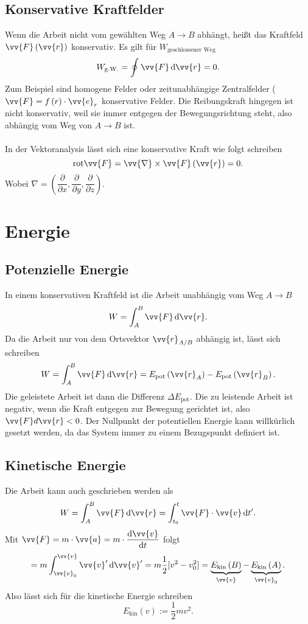 \documentclass[a4paper,12pt]{article}
\newcommand{\td}{\,\text{d}}
\begin{document}
\subsection{Konservative Kraftfelder}
Wenn die Arbeit nicht vom gewählten Weg $A\rightarrow B$ abhängt, heißt das Kraftfeld $\vv{F}\left(\vv{r}\right)$ konservativ. Es gilt für $W_{\text{geschlossener Weg}}$ 
\[ 
        W_{\text{g.W.}}=\oint_{}^{}\vv{F}\td\vv{r}=0
.\] 
Zum Beispiel sind homogene Felder oder zeitunabhängige Zentralfelder ($\vv{F}=f\left(r\right)\cdot \vv{e}_r$  konservative Felder. Die Reibungskraft hingegen ist nicht konservativ, weil sie immer entgegen der Bewegungsrichtung steht, also abhängig vom Weg von $A\rightarrow B$ ist.\\\\
In der Vektoranalysis lässt sich eine konservative Kraft wie folgt schreiben
\[ 
        \text{rot}\vv{F}=\vv{\nabla }\times\vv{F}\left(\vv{r}\right)=0
.\] 
Wobei $\nabla=\left(\dfrac{\partial }{\partial x},\dfrac{\partial }{\partial y},\dfrac{\partial }{\partial z}\right)$.

\section{Energie}

\subsection{Potenzielle Energie}
In einem konservativen Kraftfeld ist die Arbeit unabhängig vom Weg $A\rightarrow B$ 
\[ 
        W=\int_{A}^{B}\vv{F}\td\vv{r}
.\] 
Da die Arbeit nur von dem Ortsvektor $\vv{r}_{A/B}$ abhängig ist, lässt sich schreiben
\[ 
        W=\int_{A}^{B}\vv{F}\td\vv{r}=E_{\text{pot}}\left(\vv{r}_A\right)-E_{\text{pot}}\left(\vv{r}_B\right)
.\] 
Die geleistete Arbeit ist dann die Differenz $\Delta E_{\text{pot}}$. Die zu leistende Arbeit ist negativ, wenn die Kraft entgegen zur Bewegung gerichtet ist, also $\vv{F}d\vv{r}<0$. Der Nullpunkt der potentiellen Energie kann willkürlich gesetzt werden, da das System immer zu einem Bezugspunkt definiert ist.

\subsection{Kinetische Energie}
Die Arbeit kann auch geschrieben werden als
\[ 
        W=\int_{A}^{B}\vv{F}\td\vv{r}=\int_{t_0}^{t}\vv{F}\cdot \vv{v}\td t'
.\] 
Mit $\vv{F}=m\cdot \vv{a}=m\cdot \dfrac{\text{d}\vv{v}}{\text{d}t}$ folgt
\[ 
        =m\int_{\vv{v}_0}^{\vv{v}}\vv{v}'\td\vv{v}'=m\dfrac{1}{2}[v^2-v_0^2]=\underbrace{E_{\text{kin}}\left(B\right)}_{\vv{v}}-\underbrace{E_{\text{kin}}\left(A\right)}_{\vv{v}_0}
.\] 
Also lässt sich für die kinetische Energie schreiben
\[ 
        E_{\text{kin}}\left(v\right):=\dfrac{1}{2}mv^2
.\] 
\end{document}

